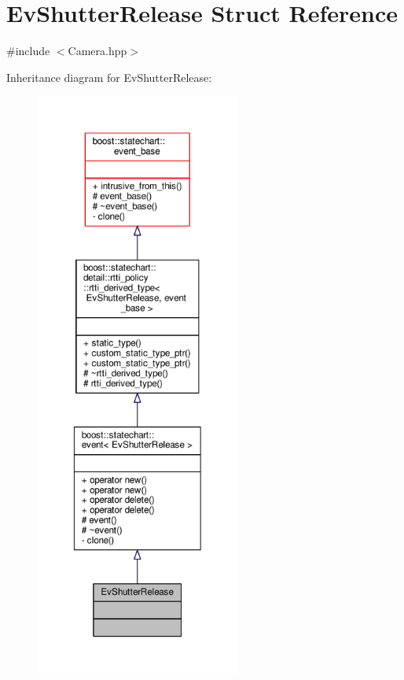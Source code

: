 \hypertarget{struct_ev_shutter_release}{}\section{Ev\+Shutter\+Release Struct Reference}
\label{struct_ev_shutter_release}


{\ttfamily \#include $<$Camera.\+hpp$>$}



Inheritance diagram for Ev\+Shutter\+Release\+:
\nopagebreak
\begin{figure}[H]
\begin{center}
\leavevmode
\includegraphics[height=550pt]{struct_ev_shutter_release__inherit__graph}
\end{center}
\end{figure}



